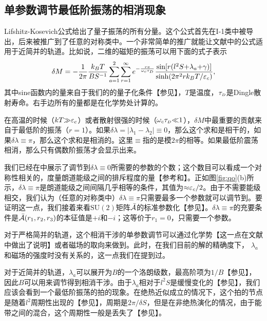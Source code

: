 \subsection{单参数调节最低阶振荡的相消现象}\label{sec:quantosc_equidis}


Lifshitz-Kosevich公式\cite{lifshitz_kosevich,lifshitz_kosevich_jetp}给出了量子振荡的所有分量。这个公式首先在I-1类中被导出\cite{rothmag}，后来被推广到了任意的对称类中\cite{topoferm}。一个非常简单的推广就能让文献中的公式适用于近简并的轨道。比如说，二维的磁矩的振荡可以用下面的式子表示
\begin{equation}
\delta M=-\frac{1}{2\pi}\frac{k_BT}{BS^{-1}}\sum_{a=1}^2\sum_{r=1}^{\infty}e^{-\frac{r\pi}{\omega_c\tau_{\scriptscriptstyle{D}}}} \frac{\text{sin}[r(l^2S{+}\lambda_a{+}\gamma)]}{\text{sinh}(2\pi^2rk_BT/\varepsilon_c)},\label{eq:LK}
\end{equation}
其中sine函数内的量来自于我们的的量子化条件【参见】，$T$是温度，$\tau_{\scriptscriptstyle{D}}$是Dingle散射寿命\cite{Dingle_collisions}。右手边所有的量都是在化学势处计算的。

在高温的时候（$kT{\gg}\varepsilon_c$）或者散射很强的时候（$\omega_c\tau_{\scriptscriptstyle{D}}{\ll}1$），$\delta M$中最重要的贡献来自于最低阶的振荡（$r{=}1$）。如果$\delta \lambda{=}|\lambda_1{-}\lambda_2|{\equiv}0$，那么这个求和是相干的，如果$\delta \lambda{\equiv}\pi$，那么这个求和是相消的。这里$\equiv$指的是模$2\pi$的相等。如果最低阶震荡相消，那么只有偶数阶振荡才会显示出来。

我们已经在中展示了调节到$\delta \lambda{\equiv}0$所需要的参数的个数；这个数目可以看成一个对称性相关的，度量朗道能级之间的排斥程度的量【参考和】。正如图\ref{fig:qo}(b)所示，$\delta \lambda{\equiv}\pi$是朗道能级之间间隔几乎相等的条件，其值为${\approx}\varepsilon_c/2$。由于不需要能级相交，我们认为（任意的对称类中）$\delta \lambda{\equiv}\pi$只需要最多一个参数就可以调节到。要证明这一点，我们接着来看$\text{SU}(2)$矩阵${\cal \bar{A}}$的标准参数化【参见】。$\delta \lambda{\equiv}\pi$的充要条件是${\cal \bar{A}}(r_1,r_2,r_3)$的本征值是$+i$和$-i$；这等价于$r_1{=}0$，只需要一个参数。

对于严格简并的轨道，这个相消干涉的单参数调节可以通过化学势【这一点在文献中做出了说明】或者磁场的取向来做到。此时，在我们目前的解的精确度下， $\lambda_a$和磁场的强度时没有关系的\cite{rothmag,fuchs_landau_2018,gao_zero-field_2017,fischbeck_review}，这一点我们在提到过。

对于近简并的轨道，$\lambda_a$可以展开为$B$的一个洛朗级数，最高阶项为$1/B$【参见】，因此$B$可以用来调节得到相消干涉。由于$\lambda_a$相对于$l^2S$是缓慢变化的【参见】，我们应该会看到一个最低阶振荡的拍的现象。在绝热近似成立的情况下，这个拍的节点是随着$l^2$周期性出现的【参见】，周期是$2\pi/\delta S$，但是在非绝热演化的情况，由于能带之间的混合，这个周期性一般是丢失了【参见】。

